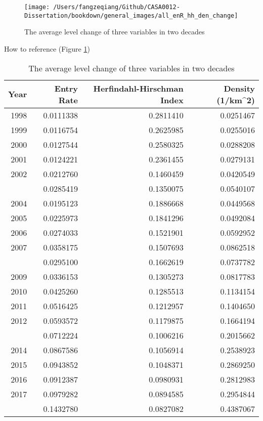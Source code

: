 \documentclass[
  12pt,
  oneside]{book}
\begin{document}
\begin{figure}
\texttt{[image: /Users/fangzeqiang/Github/CASA0012-Dissertation/bookdown/general\_images/all\_enR\_hh\_den\_change]} \caption{The average level change of three variables in two decades}\label{fig:fig-all-var-trend}
\end{figure}

How to reference (Figure \ref{fig:fig-all-var-trend})

\begin{table}

\caption{\label{tab:tab-all-var-trend}The average level change of three variables in two decades}
\centering
\begin{tabular}[t]{rrrr}
\toprule
\textbf{Year} & \textbf{Entry Rate} & \textbf{Herfindahl-Hirschman Index} & \textbf{Density (1/km\textasciicircum{}2)}\\
\midrule
1998 & 0.0111338 & 0.2811410 & 0.0251467\\
1999 & 0.0116754 & 0.2625985 & 0.0255016\\
2000 & 0.0127544 & 0.2580325 & 0.0288208\\
2001 & 0.0124221 & 0.2361455 & 0.0279131\\
2002 & 0.0212760 & 0.1460459 & 0.0420549\\
\addlinespace
2003 & 0.0285419 & 0.1350075 & 0.0540107\\
2004 & 0.0195123 & 0.1886668 & 0.0449568\\
2005 & 0.0225973 & 0.1841296 & 0.0492084\\
2006 & 0.0274033 & 0.1521901 & 0.0592952\\
2007 & 0.0358175 & 0.1507693 & 0.0862518\\
\addlinespace
2008 & 0.0295100 & 0.1662619 & 0.0737782\\
2009 & 0.0336153 & 0.1305273 & 0.0817783\\
2010 & 0.0425260 & 0.1285513 & 0.1134154\\
2011 & 0.0516425 & 0.1212957 & 0.1404650\\
2012 & 0.0593572 & 0.1179875 & 0.1664194\\
\addlinespace
2013 & 0.0712224 & 0.1006216 & 0.2015662\\
2014 & 0.0867586 & 0.1056914 & 0.2538923\\
2015 & 0.0943852 & 0.1048371 & 0.2869250\\
2016 & 0.0912387 & 0.0980931 & 0.2812983\\
2017 & 0.0979282 & 0.0894585 & 0.2954844\\
\addlinespace
2018 & 0.1432780 & 0.0827082 & 0.4387067\\
\bottomrule
\end{tabular}
\end{table}
\end{document}
